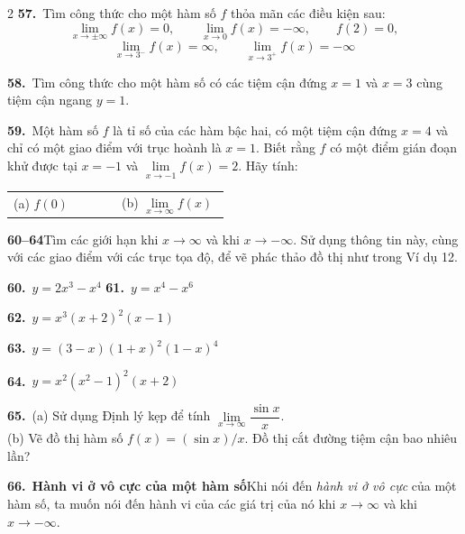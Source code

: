 \begin{multicols}{2}
\vspace{4pt}
\textbf{57.}\ Tìm công thức cho một hàm số $f$ thỏa mãn các điều kiện sau:
\[
\lim_{x \to \pm\infty} f(x) = 0, \qquad \lim_{x \to 0} f(x) = -\infty, \qquad f(2) = 0,
\]
\[
\lim_{x \to 3^-} f(x) = \infty, \qquad \lim_{x \to 3^+} f(x) = -\infty
\]

\vspace{4pt}
\textbf{58.}\ Tìm công thức cho một hàm số có các tiệm cận đứng $x = 1$ và $x = 3$ cùng tiệm cận ngang $y = 1$.

\vspace{6pt}
\textbf{59.}\ Một hàm số $f$ là tỉ số của các hàm bậc hai, có một tiệm cận đứng $x = 4$ và chỉ có một giao điểm với trục hoành là $x = 1$. Biết rằng $f$ có một điểm gián đoạn khử được tại $x = -1$ và $\lim\limits_{x \to -1} f(x) = 2$. Hãy tính:
\begin{center}
\begin{tabular}{@{}p{0.48\linewidth}p{0.48\linewidth}@{}}
(a) $f(0)$ & (b) $\lim\limits_{x \to \infty} f(x)$
\end{tabular}
\end{center}

\vfill\null
\columnbreak

{\bfseries\color{stewartblue}60--64}\quad Tìm các giới hạn khi $x \to \infty$ và khi $x \to -\infty$. Sử dụng thông tin này, cùng với các giao điểm với các trục tọa độ, để vẽ phác thảo đồ thị như trong Ví dụ 12.

\vspace{4pt}
\textbf{60.}\ $y = 2x^3 - x^4$ \hfill \textbf{61.}\ $y = x^4 - x^6$

\vspace{3pt}
\textbf{62.}\ $y = x^3(x + 2)^2(x - 1)$

\vspace{3pt}
\textbf{63.}\ $y = (3 - x)(1 + x)^2(1 - x)^4$

\vspace{3pt}
\textbf{64.}\ $y = x^2(x^2 - 1)^2(x + 2)$

\vspace{6pt}
\textbf{65.}\ (a) Sử dụng Định lý kẹp để tính $\lim\limits_{x \to \infty} \dfrac{\sin x}{x}$.\\
\marginicon(b) Vẽ đồ thị hàm số $f(x) = (\sin x)/x$. Đồ thị cắt đường tiệm cận bao nhiêu lần?

\vspace{6pt}
\marginicon\textbf{66.}\ \textbf{Hành vi ở vô cực của một hàm số}\quad Khi nói đến \emph{hành vi ở vô cực} của một hàm số, ta muốn nói đến hành vi của các giá trị của nó khi $x \to \infty$ và khi $x \to -\infty$.


\end{multicols}
